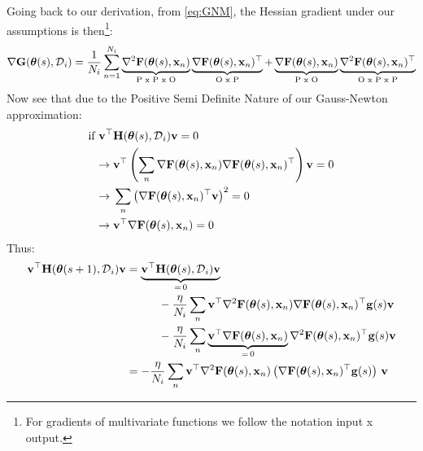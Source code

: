 \documentclass{article} %
\newcommand{\hessian}{\vH}
\begin{document}
Going back to our derivation, from \cref{eq:GNM}, the Hessian gradient under our assumptions is then\footnote{For gradients of multivariate functions we follow the notation input x output.}:
\begin{align}
    \nabla\mbox{$\mbox{$\mathbf{G}$}$}(\mbox{$\mbox{$\boldsymbol{\theta}$}$}(s), \mbox{${\cal D}$}_{i})
    = \frac{1}{N_i} \sum_{n=1}^{N_i} \underbrace{\nabla^2\mbox{$\mbox{$\mathbf{F}$}$}(\mbox{$\mbox{$\boldsymbol{\theta}$}$}(s), \mbox{$\mbox{$\mathbf{x}$}$}_n)}_\text{P x P x O}\underbrace{\nabla\mbox{$\mbox{$\mathbf{F}$}$}(\mbox{$\mbox{$\boldsymbol{\theta}$}$}(s), \mbox{$\mbox{$\mathbf{x}$}$}_n)^\top}_\text{O x P} +  \underbrace{\nabla\mbox{$\mbox{$\mathbf{F}$}$}(\mbox{$\mbox{$\boldsymbol{\theta}$}$}(s), \mbox{$\mbox{$\mathbf{x}$}$}_n)}_\text{P x O} \underbrace{\nabla^2\mbox{$\mbox{$\mathbf{F}$}$}(\mbox{$\mbox{$\boldsymbol{\theta}$}$}(s), \mbox{$\mbox{$\mathbf{x}$}$}_n)^\top}_\text{O x P x P}
\end{align}
Now see that due to the Positive Semi Definite Nature of our Gauss-Newton approximation:
\begin{align}
    \text{if } 
    &\vv^\top \hessian(\vparam(s), \data_{i}) \vv = 0 \\
    & \ra \;\vv^\top \rnd{\sum_{n}\grad{\vF(\vparam(s), \vx_n)\grad\vF(\vparam(s), \vx_n)^\top }}\vv = 0 \\
    & \ra \; \sum_{n}\rnd{\grad\vF(\vparam(s), \vx_n)^\top\vv}^2 = 0 \\
    & \ra \;\vv^\top \grad\vF(\vparam(s), \vx_n) = 0
\end{align}
Thus:
\begin{align}
    \vv^\top \hessian(\vparam(s+1), \data_i)\vv 
    & = \underbrace{\vv^\top\hessian(\vparam(s), \data_i)\vv}_{= \, 0} \\
    & \hspace{1cm}- \frac{\eta}{N_i} \sum_n \vv^\top \grad^2\vF(\vparam(s), \vx_n)\grad\vF(\vparam(s), \vx_n)^\top\vg(s)\vv \\
    & \hspace{1cm}- \frac{\eta}{N_i}\sum_n \underbrace{\vv^\top\grad\vF(\vparam(s), \vx_n)}_{= \, 0} \grad^2\vF(\vparam(s), \vx_n)^\top\vg(s)\vv \\
    &= - \frac{\eta}{N_i} \sum_n \vv^\top\grad^2\vF(\vparam(s), \vx_n)\rnd{\grad\vF(\vparam(s), \vx_n)^\top\vg(s)}\,\vv
\end{align}
\end{document}
